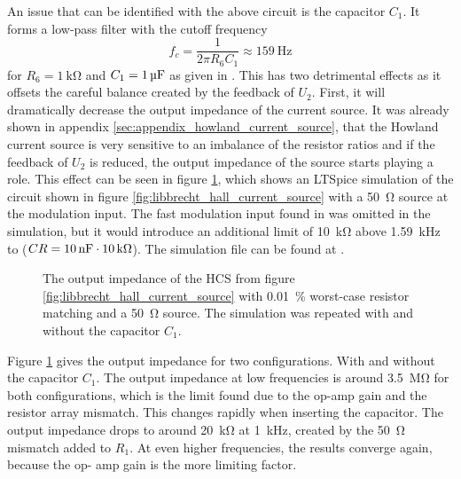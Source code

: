An issue that can be identified with the above circuit is the capacitor $C_1$. It forms a low-pass filter with the cutoff frequency
\begin{equation*}
    f_c = \frac{1}{2 \pi R_6 C_1} \approx \qty{159}{\Hz}
\end{equation*}
for $R_6 = \qty{1}{\kilo\ohm}$ and $C_1 = \qty{1}{\uF}$ as given in \cite{laser_driver_digital,libbrecht_hall}. This has two detrimental effects as it offsets the careful balance created by the feedback of $U_2$. First, it will dramatically decrease the output impedance of the current source. It was already shown in appendix \ref{sec:appendix_howland_current_source}, that the Howland current source is very sensitive to an imbalance of the resistor ratios and if the feedback of $U_2$ is reduced, the output impedance of the source starts playing a role. This effect can be seen in figure \ref{fig:output_impedance_libbrecht_hall}, which shows an LTSpice simulation of the circuit shown in figure \ref{fig:libbrecht_hall_current_source} with a \qty{50}{\ohm} source at the modulation input. The fast modulation input found in \cite{libbrecht_hall} was omitted in the simulation, but it would introduce an additional limit of \qty{10}{\kilo\ohm} above \qty{1.59}{\kHz} to ($CR=\qty{10}{\nF} \cdot \qty{10}{\kilo\ohm}$). The simulation file can be found at .
\begin{figure}[hb]
    \centering
    
    \caption{The output impedance of the HCS from figure \ref{fig:libbrecht_hall_current_source} with \qty{0.01}{\percent} worst-case resistor matching and a \qty{50}{\ohm} source. The simulation was repeated with and without the capacitor $C_1$.}
    \label{fig:output_impedance_libbrecht_hall}
\end{figure}

Figure \ref{fig:output_impedance_libbrecht_hall} gives the output impedance for two configurations. With and without the capacitor $C_1$. The output impedance at low frequencies is around \qty{3.5}{\mega\ohm} for both configurations, which is the limit found due to the op-amp gain and the resistor array mismatch. This changes rapidly when inserting the capacitor. The output impedance drops to around \qty{20}{\kilo\ohm} at \qty{1}{\kHz}, created by the \qty{50}{\ohm} mismatch added to $R_1$. At even higher frequencies, the results converge again, because the op- amp gain is the more limiting factor.

